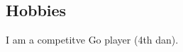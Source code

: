 \documentclass[margin,line]{res}
\newenvironment{list2}{
  \begin{list}{$\bullet$}{%
      \setlength{\itemsep}{0in}
      \setlength{\parsep}{0in} \setlength{\parskip}{0in}
      \setlength{\topsep}{0in} \setlength{\partopsep}{0in}
      \setlength{\leftmargin}{0.2in}}}{\end{list}}
\begin{document}
\begin{resume}









\section{\sc Hobbies} I am a competitve Go player (4th dan).



\end{resume}
\end{document}
